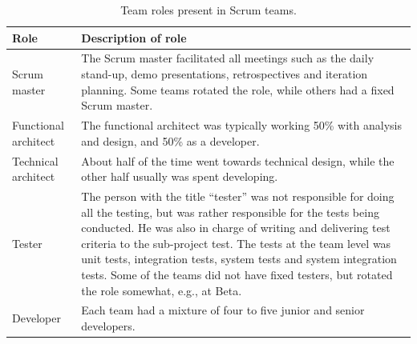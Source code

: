 \begin{table}[H]
\begin{center}
    \begin{tabular}{| p{4cm} | p{8cm} |}
    \hline
    \textbf{Role} & \textbf{Description of role} \\ \hline
    Scrum master & The Scrum master facilitated all meetings such as the daily stand-up, demo presentations, retrospectives and iteration planning. Some teams rotated the role, while others had a fixed Scrum master. \\ \hline
    Functional architect & The functional architect was typically working 50\% with analysis and design, and 50\% as a developer. \\ \hline
    Technical architect & About half of the time went towards technical design, while the other half usually was spent developing. \\ \hline
    Tester & The person with the title ``tester'' was not responsible for doing all the testing, but was rather responsible for the tests being conducted. He was also in charge of writing and delivering test criteria to the sub-project test. The tests at the team level was unit tests, integration tests, system tests and system integration tests. Some of the teams did not have fixed testers, but rotated the role somewhat, e.g., at Beta. \\ \hline
    Developer & Each team had a mixture of four to five junior and senior developers. \\ \hline
    \end{tabular}
    \caption{Team roles present in Scrum teams.}
    \label{trpist}
\end{center}
\end{table}


